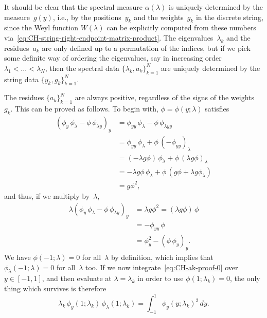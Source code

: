 \documentclass[10pt,a4paper]{article} \pdfoutput=1 
\begin{document}
It should be clear that the spectral measure $\alpha(\lambda)$
is uniquely determined by the measure~$g(y)$,
i.e., by the positions~$y_k$ and the weights~$g_k$ in the discrete string,
since the Weyl function $W(\lambda)$ can be explicitly computed from these numbers
via~\eqref{eq:CH-string-right-endpoint-matrix-product}.
The eigenvalues~$\lambda_k$ and the residues~$a_k$
are only defined up to a permutation of the indices,
but if we pick some definite way of ordering the eigenvalues,
say in increasing order $\lambda_1 < \dots < \lambda_N$,
then the spectral data $\{ \lambda_k, a_k \}_{k=1}^N$ are uniquely determined
by the string data $\{ y_k, g_k \}_{k=1}^N$.

The residues $\{ a_k \}_{k=1}^N$ are always positive,
regardless of the signs of the weights~$g_k$.
This can be proved as follows.
To begin with, $\phi = \phi(y;\lambda)$ satisfies
\begin{equation*}
  \begin{split}
    (\phi_y \, \phi_\lambda - \phi \, \phi_{\lambda y})_y
    &
    = \phi_{yy} \, \phi_\lambda - \phi \, \phi_{\lambda yy}
    \\ &
    = \phi_{yy} \, \phi_\lambda + \phi \, (-\phi_{yy})_{\lambda}
    \\ &
    = (-\lambda g \phi) \, \phi_\lambda + \phi \, (\lambda g \phi)_\lambda
    \\ &
    = - \lambda g \phi \, \phi_\lambda + \phi \, ( g \phi + \lambda g \phi_\lambda )
    \\ &
    = g \phi^2
    ,
  \end{split}
\end{equation*}
and thus, if we multiply by~$\lambda$,
\begin{equation}
  \label{eq:CH-ak-proof-0}
  \begin{split}
    \lambda (\phi_y \, \phi_\lambda - \phi \, \phi_{\lambda y})_y
    &
    = \lambda g \phi^2
    = (\lambda g \phi) \, \phi
    \\ &
    = - \phi_{yy} \, \phi
    \\ &
    = \phi_y^2 - (\phi \, \phi_y)_y
    .
  \end{split}
\end{equation}
We have $\phi(-1;\lambda)=0$ for all~$\lambda$ by definition, which implies that $\phi_\lambda(-1;\lambda)=0$
for all~$\lambda$ too.
If we now integrate~\eqref{eq:CH-ak-proof-0} over $y \in [-1,1]$,
and then evaluate at $\lambda=\lambda_k$ in order to use $\phi(1;\lambda_k)=0$,
the only thing which survives is therefore
\begin{equation}
  \label{eq:CH-ak-proof-1}
  \lambda_k \, \phi_y(1;\lambda_k) \, \phi_\lambda(1;\lambda_k)
  = \int_{-1}^1 \phi_y(y;\lambda_k)^2 \, dy
  .
\end{equation}
\end{document}
